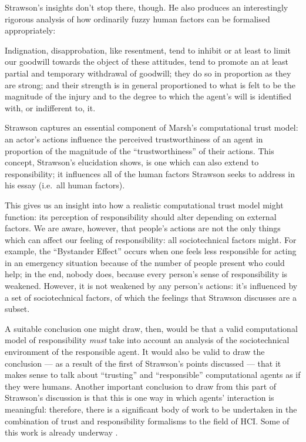 Strawson's insights don't stop there, though. He also produces an interestingly rigorous analysis of how ordinarily fuzzy human factors can be formalised appropriately:

\begin{displayquote}
    Indignation, disapprobation, like resentment, tend to inhibit or at least to limit our goodwill towards the object of these attitudes, tend to promote an at least partial and temporary withdrawal of goodwill; they do so in proportion as they are strong; and their strength is in general proportioned to what is felt to be the magnitude of the injury and to the degree to which the agent’s will is identified with, or indifferent to, it.
\end{displayquote} \parencite{strawson}\par

Strawson captures an essential component of Marsh's computational trust model: an actor's actions influence the perceived trustworthiness of an agent in proportion of the magnitude of the ``trustworthiness'' of their actions. This concept, Strawson's elucidation shows, is one which can also extend to responsibility; it influences all of the human factors Strawson seeks to address in his essay (i.e.\ all human factors).\par

This gives us an insight into how a realistic computational trust model might function: its perception of responsibility should alter depending on external factors. We are aware, however, that people's actions are not the only things which can affect our feeling of responsibility: all sociotechnical factors might. For example, the ``Bystander Effect'' \parencite{unresponsive_bystander} occurs when one feels less responsible for acting in an emergency situation because of the number of people present who could help; in the end, nobody does, because every person's sense of responsibility is weakened. However, it is not weakened by any person's actions: it's influenced by a set of sociotechnical factors, of which the feelings that Strawson discusses are a subset.\par

A suitable conclusion one might draw, then, would be that a valid computational model of responsibility \emph{must} take into account an analysis of the sociotechnical environment of the responsible agent. It would also be valid to draw the conclusion --- as a result of the first of Strawson's points discussed --- that it makes sense to talk about ``trusting'' and ``responsible'' computational agents as if they were humans. Another important conclusion to draw from this part of Strawson's discussion is that this is one way in which agents' interaction is meaningful: therefore, there is a significant body of work to be undertaken in the combination of trust and responsibility formalisms to the field of HCI\@. Some of this work is already underway \parencite{Marsh2011, Macy2002}. \par


